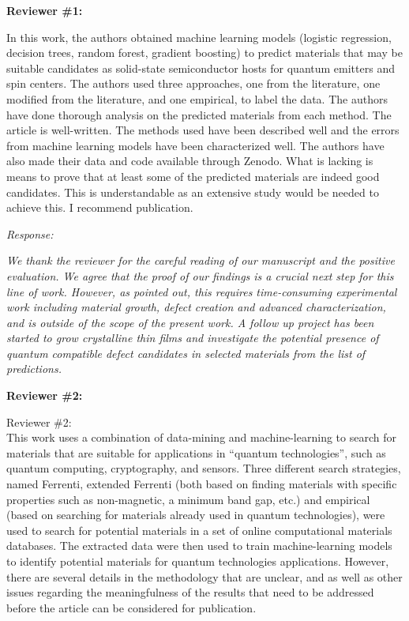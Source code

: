 \documentclass[11pt, a4paper]{letter} %
\begin{document}
\noindent
\textbf{Reviewer \#1: }

In this work, the authors obtained machine learning models (logistic regression, decision trees, random forest, gradient boosting) to predict materials that may be suitable candidates as solid-state semiconductor hosts for quantum emitters and spin centers. The authors used three approaches, one from the literature, one modified from the literature, and one empirical, to label the data. The authors have done thorough analysis on the predicted materials from each method. The article is well-written. The methods used have been described well and the errors from machine learning models have been characterized well. The authors have also made their data and code available through Zenodo. What is lacking is means to prove that at least some of the predicted materials are indeed good candidates. This is understandable as an extensive study would be needed to achieve this. I recommend publication.  

\textit{Response: }  

\textit{We thank the reviewer for the careful reading of our manuscript and the positive evaluation. We agree that the proof of our findings is a crucial next step for this line of work. However, as pointed out, this requires time-consuming experimental work including material growth, defect creation and advanced characterization, and is outside of the scope of the present work. A follow up project has been started to grow crystalline thin films and investigate the potential presence of quantum compatible defect candidates in selected materials from the list of predictions. }

\noindent
\textbf{Reviewer \#2: }

Reviewer \#2: \\
This work uses a combination of data-mining and machine-learning to search for materials that are suitable for applications in “quantum technologies”, such as quantum computing, cryptography, and sensors. Three different search strategies, named Ferrenti, extended Ferrenti (both based on finding materials with specific properties such as non-magnetic, a minimum band gap, etc.) and empirical (based on searching for materials already used in quantum technologies), were used to search for potential materials in a set of online computational materials databases. The extracted data were then used to train machine-learning models to identify potential materials for quantum technologies applications. However, there are several details in the methodology that are unclear, and as well as other issues regarding the meaningfulness of the results that need to be addressed before the article can be considered for publication.
\end{document}
